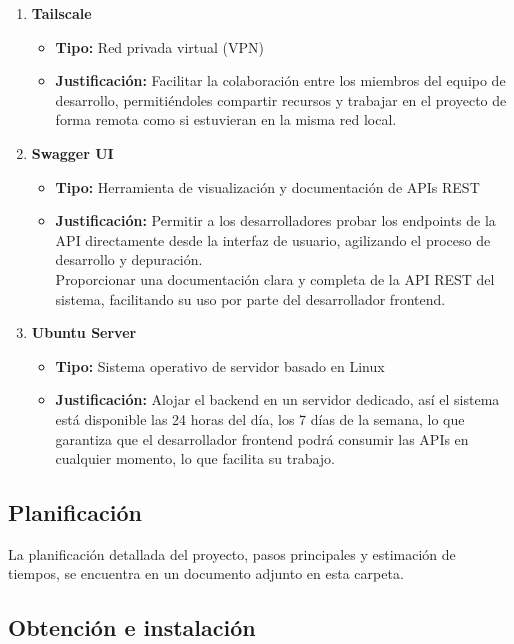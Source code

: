 \documentclass{article} %
\begin{document}
\begin{enumerate}[font=\bfseries]
    \item \textbf{Tailscale}
    \begin{itemize}
        \item \textbf{Tipo:} Red privada virtual (VPN)
        \item \textbf{Justificación:} Facilitar la colaboración entre los miembros del equipo de desarrollo, permitiéndoles compartir recursos y trabajar en el proyecto de forma remota como si estuvieran en la misma red local.
    \end{itemize}
    
    \item \textbf{Swagger UI}
    \begin{itemize}
        \item \textbf{Tipo:} Herramienta de visualización y documentación de APIs REST
        \item \textbf{Justificación:} Permitir a los desarrolladores probar los endpoints de la API directamente desde la interfaz de usuario, agilizando el proceso de desarrollo y depuración. \\
        Proporcionar una documentación clara y completa de la API REST del sistema, facilitando su uso por parte del desarrollador frontend.
    \end{itemize}
    
    \item \textbf{Ubuntu Server}
    \begin{itemize}
        \item \textbf{Tipo:} Sistema operativo de servidor basado en Linux
        \item \textbf{Justificación:} Alojar el backend en un servidor dedicado, así el sistema está disponible las 24 horas del día, los 7 días de la semana, lo que garantiza que el desarrollador frontend podrá consumir las APIs en cualquier momento, lo que facilita su trabajo.
    \end{itemize}
\end{enumerate}

\subsection{Planificación}
\noindent
La planificación detallada del proyecto, pasos principales y estimación de tiempos, se encuentra en un documento adjunto en esta carpeta.

\subsection{Obtención e instalación}
\end{document}
